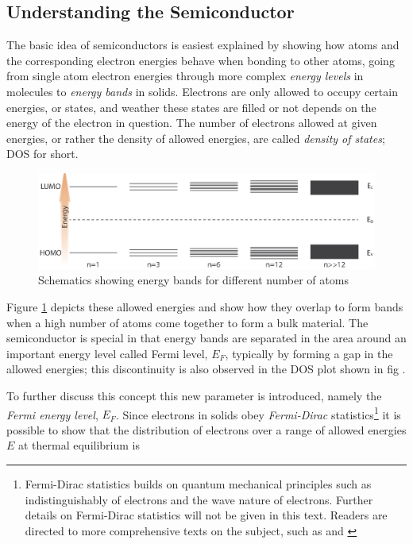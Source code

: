{\subsection{Understanding the Semiconductor}

The basic idea of semiconductors is easiest explained by showing how atoms and the corresponding electron energies behave when bonding to other atoms, going from single atom electron energies through more complex \textit{energy levels} in molecules to \textit{energy bands} in solids. Electrons are only allowed to occupy certain energies, or states, and weather these states are filled or not depends on the energy of the electron in question. The number of electrons allowed at given energies, or rather the density of allowed energies,  are called \textit{density of states}; DOS for short.

\begin{figure}[ht!]
\centering
\includegraphics[scale=1]{Figures/Energy_bands1.eps}
\caption{Schematics showing energy bands for different number of atoms}
\label{fig:energy_bands}
\end{figure}

Figure \ref{fig:energy_bands} depicts these allowed energies and show how they overlap to form bands when a high number of atoms come together to form a bulk material. The semiconductor is special in that energy bands are separated in the area around an important energy level called Fermi level, $E_F$, typically by  forming a gap in the allowed energies; this discontinuity is also observed in the DOS plot shown in fig . 

To further discuss this concept this new parameter is introduced, namely the \textit{Fermi energy level}, $E_F$. Since electrons in solids obey \textit{Fermi-Dirac} statistics\footnote{Fermi-Dirac statistics builds on quantum mechanical principles such as indistinguishably of electrons and the wave nature of electrons. Further details on Fermi-Dirac statistics will not be given in this text. Readers are directed to more comprehensive texts on the subject, such as \citet{Schroeder1999} and \citet{Kittel2004}}  it is possible to show that the distribution of electrons over a range of allowed energies $E$ at thermal equilibrium is

}
